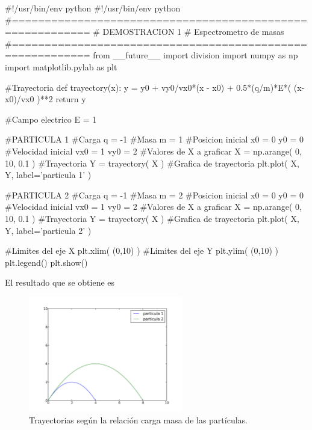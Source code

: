\newpage
\begin{listing}[style=python]
#!/usr/bin/env python
#!/usr/bin/env python
#==========================================================
# DEMOSTRACION 1
# Espectrometro de masas
#==========================================================
from __future__ import division
import numpy as np
import matplotlib.pylab as plt

#Trayectoria
def trayectory(x):
    y = y0 + vy0/vx0*(x - x0) + 0.5*(q/m)*E*( (x-x0)/vx0 )**2
    return y
    
#Campo electrico
E = 1
    
#PARTICULA 1
#Carga
q = -1
#Masa
m = 1
#Posicion inicial
x0 = 0
y0 = 0
#Velocidad inicial
vx0 = 1
vy0 = 2
#Valores de X a graficar
X = np.arange( 0, 10, 0.1 )
#Trayectoria
Y = trayectory( X )
#Grafica de trayectoria
plt.plot( X, Y, label='particula 1' )

#PARTICULA 2
#Carga
q = -1
#Masa
m = 2
#Posicion inicial
x0 = 0
y0 = 0
#Velocidad inicial
vx0 = 1
vy0 = 2
#Valores de X a graficar
X = np.arange( 0, 10, 0.1 )
#Trayectoria
Y = trayectory( X )
#Grafica de trayectoria
plt.plot( X, Y, label='particula 2' )

#Limites del eje X
plt.xlim( (0,10) )
#Limites del eje Y
plt.ylim( (0,10) )
plt.legend()
plt.show()
\end{listing}


El resultado que se obtiene es


\begin{figure}[htbp]
	\centering
	\includegraphics[width=0.6\textwidth]
	{./pictures/demo2_01.pdf}

	\caption{\small{Trayectorias según la relación carga masa de las 
	partículas.}}
	
	\label{fig:trayectories}
\end{figure}


